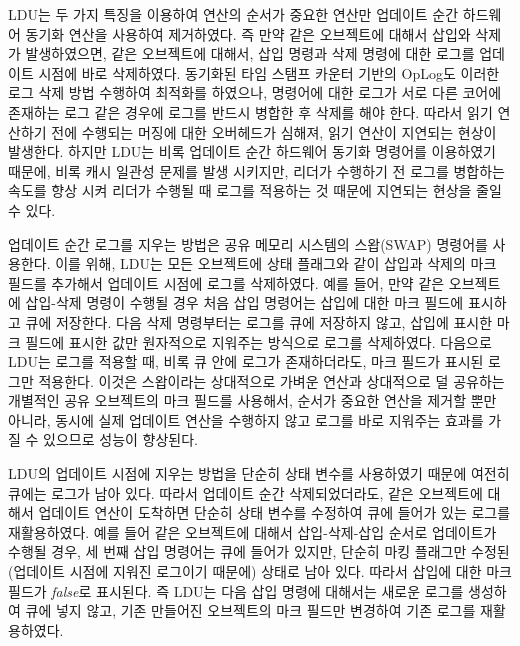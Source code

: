 LDU는 두 가지 특징을 이용하여 연산의 순서가 중요한 연산만 업데이트 순간 하드웨어 
동기화 연산을 사용하여 제거하였다. 
즉 만약 같은 오브젝트에 대해서 삽입와 삭제가 발생하였으면, 
같은 오브젝트에 대해서, 삽입 명령과 삭제 명령에 대한 로그를 업데이트 시점에 바로 삭제하였다. 
동기화된 타임 스탬프 카운터 기반의 OpLog도 이러한 로그 삭제 방법 
수행하여 최적화를 하였으나, 명령어에 대한 로그가 서로 다른 코어에 존재하는 로그 같은 경우에 
로그를 반드시 병합한 후 삭제를 해야 한다.
따라서 읽기 연산하기 전에 수행되는 머징에 대한 오버헤드가 심해져, 읽기 연산이 지연되는 현상이 발생한다.
하지만 LDU는 비록 업데이트 순간 하드웨어 동기화 명령어를 이용하였기 때문에,
비록 캐시 일관성 문제를 발생 시키지만, 리더가 수행하기 전 로그를 병합하는 속도를 향상 시켜 
리더가 수행될 때 로그를 적용하는 것 때문에 지연되는 현상을 줄일 수 있다.

업데이트 순간 로그를 지우는 방법은 공유 메모리 시스템의 스왑(SWAP) 명령어를 사용한다.
이를 위해, LDU는 모든 오브젝트에 상태 플래그와 같이 삽입과 삭제의 마크 필드를 추가해서 
업데이트 시점에 로그를 삭제하였다. 
예를 들어, 만약 같은 오브젝트에 삽입-삭제 명령이 수행될 경우 처음 삽입 명령어는
삽입에 대한 마크 필드에 표시하고 큐에 저장한다. 
다음 삭제 명령부터는 로그를 큐에 저장하지 않고, 삽입에 표시한 마크 필드에 표시한 값만
원자적으로 지워주는 방식으로 로그를 삭제하였다.
다음으로 LDU는 로그를 적용할 때, 비록 큐 안에 로그가 존재하더라도, 마크 필드가 표시된 로그만 적용한다.
이것은 스왑이라는 상대적으로 가벼운 연산과 상대적으로 덜 공유하는 개별적인 공유 오브젝트의
마크 필드를 사용해서, 순서가 중요한 연산을 제거할 뿐만 아니라, 동시에 실제
업데이트 연산을 수행하지 않고 로그를 바로 지워주는 효과를 가질 수 있으므로 성능이 향상된다. 

LDU의 업데이트 시점에 지우는 방법을 단순히 상태 변수를 사용하였기 때문에 여전히 큐에는 로그가 남아 있다.
따라서 업데이트 순간 삭제되었더라도, 같은 오브젝트에 대해서 업데이트 연산이 도착하면
단순히 상태 변수를 수정하여 큐에 들어가 있는 로그를 재활용하였다.
예를 들어 같은 오브젝트에 대해서 삽입-삭제-삽입 순서로 업데이트가 수행될 경우, 
세 번째 삽입 명령어는 큐에 들어가 있지만, 단순히 마킹 플래그만 
수정된(업데이트 시점에 지워진 로그이기 때문에) 상태로 남아 있다. 
따라서 삽입에 대한 마크 필드가 \textit{false}로 표시된다. 
즉 LDU는 다음 삽입 명령에 대해서는 새로운 로그를 생성하여 큐에 넣지 않고, 
기존 만들어진 오브젝트의 마크 필드만 변경하여 기존 로그를 재활용하였다.

